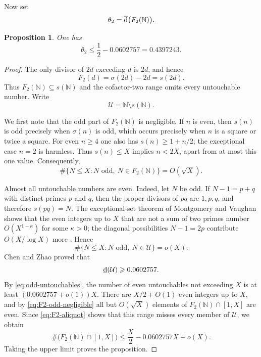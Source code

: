 \documentclass[11pt,letterpaper,reqno]{amsart}
\numberwithin{equation}{section}
\newtheorem{proposition}[theorem]{Proposition}
\theoremstyle{remark}
\newcommand{\N}{\mathbb{N}}
\newcommand{\1}{\mathbf 1}
\newcommand{\lowerdens}{\underline{\textup{d}}}
\newcommand{\upperdens}{\overline{\textup{d}}}
\renewcommand{\leq}{\leqslant}
\renewcommand{\geq}{\geqslant}
\begin{document}
Now set
\[
 \theta_2=\upperdens\bigl(F_2(\N)\bigr).
\]

\begin{proposition}\label{prop:theta-two}
One has
\[
 \theta_2\leq\frac12-0.0602757=0.4397243.
\]
\end{proposition}

\begin{proof}
The only divisor of $2d$ exceeding $d$ is $2d$, and hence
\begin{equation}\label{eq:F2-aliquot}
 F_2(d)=\sigma(2d)-2d=s(2d).
\end{equation}
Thus $F_2(\N)\subseteq s(\N)$ and the cofactor-two range omits every
untouchable number. Write
\[
 \mathcal{U}=\N\setminus s(\N).
\]

We first note that the odd part of $F_2(\N)$ is negligible. If $n$ is even,
then $s(n)$ is odd precisely when $\sigma(n)$ is odd, which occurs precisely
when $n$ is a square or twice a square. For even $n\geq4$ one also has
$s(n)\geq1+n/2$; the exceptional case $n=2$ is harmless. Thus $s(n)\leq X$
implies $n<2X$, apart from at most this one value. Consequently,
\begin{equation}\label{eq:F2-odd-negligible}
 \#\{N\leq X:N\text{ odd},\ N\in F_2(\N)\}=O(\sqrt X).
\end{equation}

Almost all untouchable numbers are even. Indeed, let $N$ be odd. If
$N-1=p+q$ with distinct primes $p$ and $q$, then the proper divisors of $pq$
are $1,p,q$, and therefore $s(pq)=N$. The exceptional-set theorem of
Montgomery and Vaughan shows that the even integers up to $X$ that are not a
sum of two primes number $O(X^{1-\kappa})$ for some $\kappa>0$; the diagonal
possibilities $N-1=2p$ contribute $O(X/\log X)$ more \cite{MVGoldbach}.
Hence
\begin{equation}\label{eq:odd-untouchables}
 \#\{N\leq X:N\text{ odd},\ N\in\mathcal{U}\}=o(X).
\end{equation}
Chen and Zhao proved \cite{ChenZhao} that
\[
 \lowerdens(\mathcal{U})\geq0.0602757.
\]
By \eqref{eq:odd-untouchables}, the number of even
untouchables not exceeding $X$ is at least
$(0.0602757+o(1))X$. There are $X/2+O(1)$ even integers up to $X$, and by
\eqref{eq:F2-odd-negligible} all but $O(\sqrt X)$ elements of
$F_2(\N)\cap[1,X]$ are even. Since \eqref{eq:F2-aliquot} shows that this
range misses every member of $\mathcal{U}$, we obtain
\[
 \#\bigl(F_2(\N)\cap[1,X]\bigr)
 \leq\frac X2-0.0602757X+o(X).
\]
Taking the upper limit proves the proposition.
\end{proof}
\end{document}
